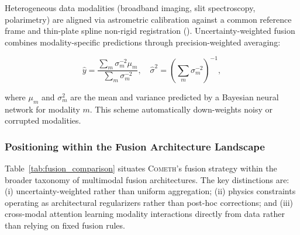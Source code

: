 \documentclass[usenatbib]{mnras}
\begin{document}
Heterogeneous data modalities (broadband imaging, slit spectroscopy, polarimetry) are aligned via astrometric calibration against a common reference frame and thin-plate spline non-rigid registration (\citealt{bertin06}). Uncertainty-weighted fusion combines modality-specific predictions through precision-weighted averaging:

\begin{equation}\label{eq:uncertainty_fusion}
\hat{y} = \frac{\sum_m \sigma_m^{-2} \mu_m}{\sum_m \sigma_m^{-2}}, \quad \hat{\sigma}^2 = \left(\sum_m \sigma_m^{-2}\right)^{-1},
\end{equation}

where $\mu_m$ and $\sigma_m^2$ are the mean and variance predicted by a Bayesian neural network for modality $m$. This scheme automatically down-weights noisy or corrupted modalities.

\subsubsection{Positioning within the Fusion Architecture Landscape}

Table~\ref{tab:fusion_comparison} situates \textsc{Cometh}'s fusion strategy within the broader taxonomy of multimodal fusion architectures. The key distinctions are: (i) uncertainty-weighted rather than uniform aggregation; (ii) physics constraints operating as architectural regularizers rather than post-hoc corrections; and (iii) cross-modal attention learning modality interactions directly from data rather than relying on fixed fusion rules.
\end{document}
